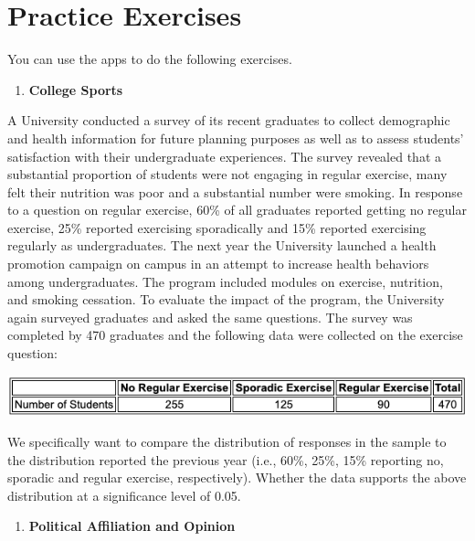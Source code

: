 \documentclass[
]{article}
\providecommand{\tightlist}{%
  \setlength{\itemsep}{0pt}\setlength{\parskip}{0pt}}
\begin{document}
\hfill\break

\hypertarget{practice-exercises}{%
\section{Practice Exercises}\label{practice-exercises}}

\hfill\break
\hfill\break
You can use the apps to do the following exercises.

\begin{enumerate}
\def\labelenumi{\arabic{enumi}.}
\tightlist
\item
  \textbf{College Sports}
\end{enumerate}

A University conducted a survey of its recent graduates to collect
demographic and health information for future planning purposes as well
as to assess students' satisfaction with their undergraduate
experiences. The survey revealed that a substantial proportion of
students were not engaging in regular exercise, many felt their
nutrition was poor and a substantial number were smoking. In response to
a question on regular exercise, 60\% of all graduates reported getting
no regular exercise, 25\% reported exercising sporadically and 15\%
reported exercising regularly as undergraduates. The next year the
University launched a health promotion campaign on campus in an attempt
to increase health behaviors among undergraduates. The program included
modules on exercise, nutrition, and smoking cessation. To evaluate the
impact of the program, the University again surveyed graduates and asked
the same questions. The survey was completed by 470 graduates and the
following data were collected on the exercise question:

\begin{center}\includegraphics[width=0.75\linewidth]{week13/practiceEx01Data} \end{center}

We specifically want to compare the distribution of responses in the
sample to the distribution reported the previous year (i.e., 60\%, 25\%,
15\% reporting no, sporadic and regular exercise, respectively). Whether
the data supports the above distribution at a significance level of
0.05.

\begin{enumerate}
\def\labelenumi{\arabic{enumi}.}
\setcounter{enumi}{1}
\tightlist
\item
  \textbf{Political Affiliation and Opinion}
\end{enumerate}
\end{document}

